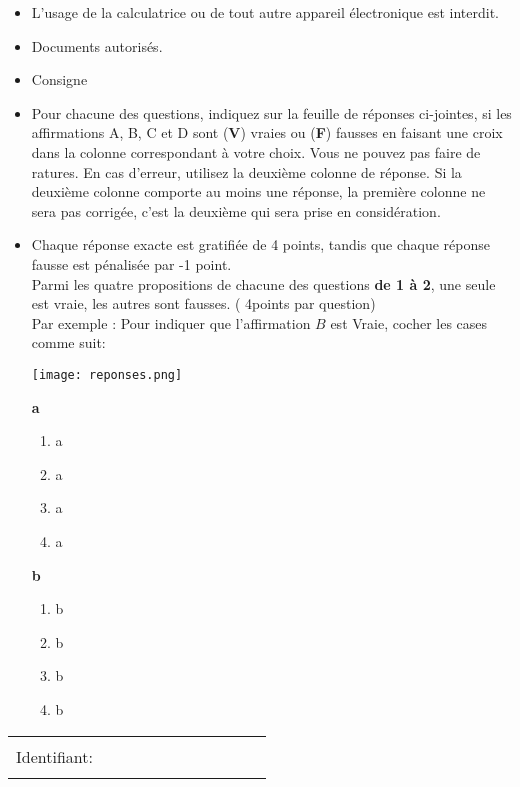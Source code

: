 \documentclass{book}%
\begin{document}
\begin{itemize}%
\item%
L'usage de la calculatrice ou de tout autre appareil électronique est interdit.%
\item%
Documents autorisés.%
\item%
Consigne%
\item%
Pour chacune des questions, indiquez sur la feuille de réponses ci-jointes, si les affirmations A, B, C et D sont (\textbf{V}) vraies ou (\textbf{F}) fausses en faisant une croix dans la colonne correspondant à votre choix. Vous ne pouvez pas faire de ratures. En cas d'erreur, utilisez la deuxième colonne de réponse. Si la deuxième colonne comporte au moins une réponse, la première colonne ne sera pas corrigée, c'est la deuxième qui sera prise en considération.%
\item%
Chaque réponse exacte est gratifiée de 4 points, tandis que chaque réponse fausse est pénalisée par -1 point. \\ 	Parmi les quatre propositions de chacune des questions \textbf{de 1 à 2}, une seule est vraie, les autres sont fausses. ( 4points par question) \\ 	Par exemple : Pour indiquer que l'affirmation $B$ est Vraie, cocher les cases comme suit:  \\ \begin{center}	\texttt{[image: reponses.png]} \end{center}%
\begin{exercise}%
\textbf{a }%
\begin{enumerate}[label=\textbf{\Alph*. }]%
\item%
a%
\item%
a%
\item%
a%
\item%
a%
\end{enumerate}%
\end{exercise}%
\begin{exercise}%
\textbf{b }%
\begin{enumerate}[label=\textbf{\Alph*. }]%
\item%
b%
\item%
b%
\item%
b%
\item%
b%
\end{enumerate}%
\end{exercise}%
\end{itemize}%
\newpage%
\thispagestyle{empty}%
\begin{flushright}%
\begin{tabular}{|l|}%
\hline%
 \\%
Identifiant: $\qquad \qquad \qquad \qquad \qquad$ \\%
 \\%
\hline%
\end{tabular}%
\end{flushright}%
\end{document}

